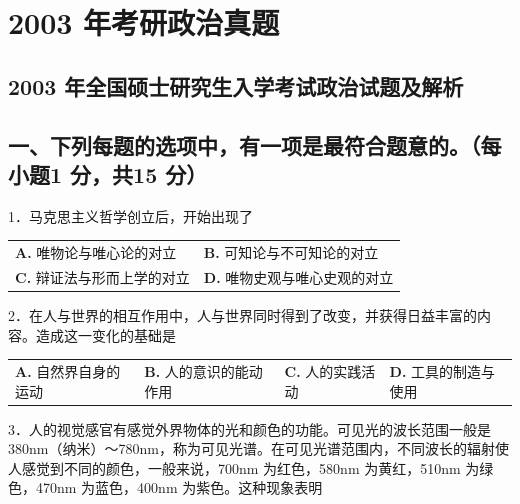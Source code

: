 \documentclass[UTF8,11pt]{ctexart}
\begin{document}
\section*{2003 年考研政治真题}
\subsection*{2003 年全国硕士研究生入学考试政治试题及解析}

\subsection*{一、下列每题的选项中，有一项是最符合题意的。（每小题1 分，共15 分）}

1．马克思主义哲学创立后，开始出现了


\begin{center}\begin{tabular}{>{\raggedright\arraybackslash}p{\dimexpr(\linewidth-4\tabcolsep)/2\relax}>{\raggedright\arraybackslash}p{\dimexpr(\linewidth-4\tabcolsep)/2\relax}}
\textbf{A.} 唯物论与唯心论的对立 & \textbf{B.} 可知论与不可知论的对立\\[.35em]
\textbf{C.} 辩证法与形而上学的对立 & \textbf{D.} 唯物史观与唯心史观的对立\\[.35em]\end{tabular}\end{center}

2．在人与世界的相互作用中，人与世界同时得到了改变，并获得日益丰富的内容。造成这一变化的基础是


\begin{center}\begin{tabular}{>{\raggedright\arraybackslash}p{\dimexpr(\linewidth-8\tabcolsep)/4\relax}>{\raggedright\arraybackslash}p{\dimexpr(\linewidth-8\tabcolsep)/4\relax}>{\raggedright\arraybackslash}p{\dimexpr(\linewidth-8\tabcolsep)/4\relax}>{\raggedright\arraybackslash}p{\dimexpr(\linewidth-8\tabcolsep)/4\relax}}
\textbf{A.} 自然界自身的运动 & \textbf{B.} 人的意识的能动作用 & \textbf{C.} 人的实践活动 & \textbf{D.} 工具的制造与使用\\[.35em]\end{tabular}\end{center}

3．人的视觉感官有感觉外界物体的光和颜色的功能。可见光的波长范围一般是380nm（纳米）～780nm，称为可见光谱。在可见光谱范围内，不同波长的辐射使人感觉到不同的颜色，一般来说，700nm 为红色，580nm 为黄红，510nm 为绿色，470nm 为蓝色，400nm 为紫色。这种现象表明
\end{document}
